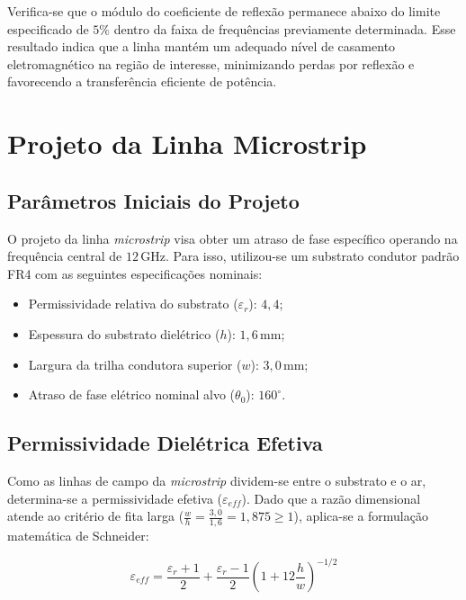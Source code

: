 \documentclass[12pt,a4paper]{report}
\begin{document}
Verifica-se que o módulo do coeficiente de reflexão permanece abaixo do limite especificado de $5\%$ dentro da faixa de frequências previamente determinada. Esse resultado indica que a linha mantém um adequado nível de casamento eletromagnético na região de interesse, minimizando perdas por reflexão e favorecendo a transferência eficiente de potência.


\chapter{Projeto da Linha Microstrip}

\section{Parâmetros Iniciais do Projeto}

O projeto da linha \textit{microstrip} visa obter um atraso de fase específico operando na frequência central de $12\,\text{GHz}$. Para isso, utilizou-se um substrato condutor padrão FR4 com as seguintes especificações nominais:

\begin{itemize}
    \item Permissividade relativa do substrato ($\varepsilon_r$): $4,4$;
    \item Espessura do substrato dielétrico ($h$): $1,6\,\text{mm}$;
    \item Largura da trilha condutora superior ($w$): $3,0\,\text{mm}$;
    \item Atraso de fase elétrico nominal alvo ($\theta_0$): $160^{\circ}$.
\end{itemize}

\newpage

\section{Permissividade Dielétrica Efetiva}

Como as linhas de campo da \textit{microstrip} dividem-se entre o substrato e o ar, determina-se a permissividade efetiva ($\varepsilon_{eff}$). Dado que a razão dimensional atende ao critério de fita larga ($\frac{w}{h} = \frac{3,0}{1,6} = 1,875 \ge 1$), aplica-se a formulação matemática de Schneider:

\begin{equation}
\boxed{
\varepsilon_{eff} = \frac{\varepsilon_r+1}{2} + \frac{\varepsilon_r-1}{2}\left(1+12\frac{h}{w}\right)^{-1/2}
}
\end{equation}
\end{document}
